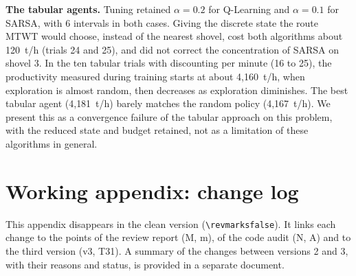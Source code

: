 \documentclass[11pt,a4paper]{article}
\newif\ifrevmarks
\newcommand{\revtag}[1]{\ifrevmarks\textsuperscript{\textcolor{red!70!black}{\scriptsize[#1]}}\fi}
\newenvironment{revbloc}[1]{\par\ifrevmarks\color{revcolor}\noindent\revtag{#1}\ \fi}{\par}
\begin{document}
\begin{revbloc}{v3}
\textbf{The tabular agents.} Tuning retained $\alpha = 0.2$ for Q-Learning and $\alpha = 0.1$ for SARSA, with 6 intervals in both cases. Giving the discrete state the route MTWT would choose, instead of the nearest shovel, cost both algorithms about 120~t/h (trials 24 and 25), and did not correct the concentration of SARSA on shovel 3. In the ten tabular trials with discounting per minute (16 to 25), the productivity measured during training starts at about 4{,}160~t/h, when exploration is almost random, then decreases as exploration diminishes. The best tabular agent (4{,}181~t/h) barely matches the random policy (4{,}167~t/h). We present this as a convergence failure of the tabular approach on this problem, with the reduced state and budget retained, not as a limitation of these algorithms in general.
\end{revbloc}

\ifrevmarks
\clearpage
\appendix
\section*{Working appendix: change log}

This appendix disappears in the clean version (\texttt{\textbackslash revmarksfalse}). It links each change to the points of the review report (M, m), of the code audit (N, A) and to the third version (v3, T31). A summary of the changes between versions 2 and 3, with their reasons and status, is provided in a separate document.
\end{document}
